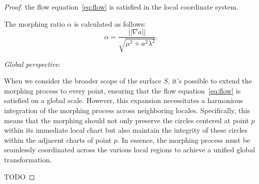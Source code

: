 \begin{proof}
    the flow equation~\eqref{eq:flow} is satisfied in the local coordinate system.

    The morphing ratio \( \alpha \) is calculated as follows:
    \begin{equation}
        \alpha = \frac{||\nabla a||}{\sqrt{\mu^2 + a^2 \lambda^2}}\label{eq:ratio}.
    \end{equation}

    \emph{Global perspective}:

    When we consider the broader scope of the surface \( S \), it's possible to extend the morphing process to every point,
    ensuring that the flow equation~\eqref{eq:flow} is satisfied on a global scale.
    However, this expansion necessitates a harmonious integration of the morphing process across neighboring locales.
    Specifically, this means that the morphing should not only preserve the circles centered at point \( p \) within its immediate local chart
    but also maintain the integrity of these circles within the adjacent charts of point \( p \).
    In essence, the morphing process must be seamlessly coordinated across the various local regions to achieve a unified global transformation.

    TODO

    \qedhere
\end{proof}
